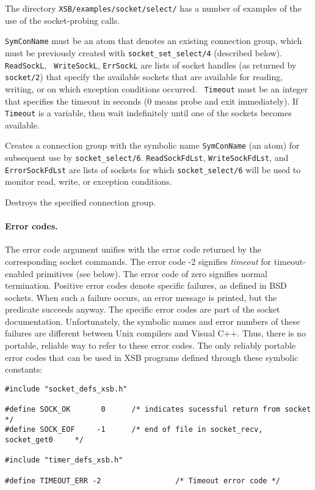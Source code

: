 The directory {\tt XSB/examples/socket/select/} has a number of examples of
the use of the socket-probing calls.
\begin{description}
   
  {\tt SymConName} must be an atom that
  denotes an existing connection group, which must be previously created with
  {\tt socket\_set\_select/4} (described below). {\tt ReadSockL}, {\tt
    WriteSockL}, {\tt ErrSockL} are lists of socket handles (as returned by
  {\tt socket/2}) that specify the available sockets that are available for
  reading, writing, or on which exception conditions occurred.  {\tt
    Timeout} must be an integer that specifies the timeout in seconds (0
  means probe and exit immediately). If {\tt Timeout} is a variable, then
  wait indefinitely until one of the sockets becomes available.

 
Creates a connection group with the symbolic name {\tt SymConName}
(an atom) for subsequent use by {\tt socket\_select/6}.
{\tt ReadSockFdLst}, {\tt WriteSockFdLst}, and {\tt ErrorSockFdLst} are
lists of sockets for which {\tt socket\_select/6} will be used to monitor read,
write, or exception conditions.

 
Destroys the specified connection group.

\end{description}


\paragraph{Error codes.}
The error code argument unifies with the error code returned by the
corresponding socket commands. The error code -2 signifies
\emph{timeout} for timeout-enabled primitives (see below). The error code
of zero signifies normal termination. Positive error codes denote specific
failures, as defined in BSD sockets. When such a failure occurs, an error
message is printed, but the predicate succeeds anyway. The specific error
codes are part of the socket documentation. Unfortunately, the symbolic
names and error numbers of these failures are different between Unix
compilers and Visual C++. Thus, there is no portable, reliable way to refer
to these error codes. The only reliably portable error codes that can be 
used in XSB programs defined through these symbolic constants:
\begin{verbatim}
#include "socket_defs_xsb.h"  

#define SOCK_OK       0      /* indicates sucessful return from socket      */
#define SOCK_EOF     -1      /* end of file in socket_recv, socket_get0     */

#include "timer_defs_xsb.h"

#define TIMEOUT_ERR -2                 /* Timeout error code */
\end{verbatim}


